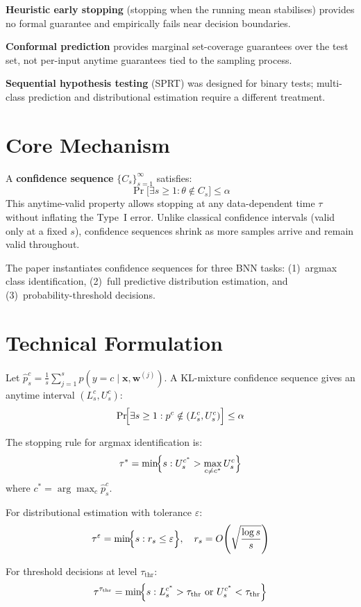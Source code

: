 \documentclass[10pt,twocolumn]{article}
\begin{document}
\textbf{Heuristic early stopping} (stopping when the running mean
stabilises) provides no formal guarantee and empirically fails near
decision boundaries.

\textbf{Conformal prediction} provides marginal set-coverage guarantees
over the test set, not per-input anytime guarantees tied to the sampling
process.

\textbf{Sequential hypothesis testing} (SPRT) was designed for binary
tests; multi-class prediction and distributional estimation require
a different treatment.

\section{Core Mechanism}

A \textbf{confidence sequence} $\{C_s\}_{s=1}^\infty$ satisfies:
\[
\Pr\!\bigl[\exists s \geq 1 : \theta \notin C_s\bigr] \leq \alpha
\]
This anytime-valid property allows stopping at any data-dependent time
$\tau$ without inflating the Type~I error. Unlike classical confidence
intervals (valid only at a fixed $s$), confidence sequences shrink
as more samples arrive and remain valid throughout.

The paper instantiates confidence sequences for three BNN tasks:
(1)~argmax class identification, (2)~full predictive distribution
estimation, and (3)~probability-threshold decisions.

\section{Technical Formulation}

Let $\hat{p}_s^c = \frac{1}{s}\sum_{j=1}^s p(y=c \mid \mathbf{x}, \mathbf{w}^{(j)})$.
A KL-mixture confidence sequence gives an anytime interval $(L_s^c, U_s^c)$:
\[
\Pr\!\Bigl[\exists s \geq 1 : p^c \notin (L_s^c, U_s^c)\Bigr] \leq \alpha
\]

The stopping rule for argmax identification is:
\[
\tau^* = \min\!\Bigl\{s : U_s^{c^*} > \max_{c \neq c^*} U_s^c \Bigr\}
\]
where $c^* = \arg\max_c \hat{p}_s^c$.

For distributional estimation with tolerance $\varepsilon$:
\[
\tau^\varepsilon = \min\!\Bigl\{s : r_s \leq \varepsilon\Bigr\},
\quad r_s = O\!\left(\sqrt{\frac{\log s}{s}}\right)
\]

For threshold decisions at level $\tau_\text{thr}$:
\[
\tau^{\tau_\text{thr}} = \min\!\Bigl\{s : L_s^{c^*} > \tau_\text{thr}
\text{ or } U_s^{c^*} < \tau_\text{thr}\Bigr\}
\]
\end{document}

